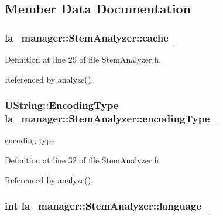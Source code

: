 \subsection{Member Data Documentation}
\hypertarget{classla__manager_1_1StemAnalyzer_f874202062430a5bce7b8ca72ee632ea}{
\subsubsection[{cache\_\-}]{ {\bf la\_\-manager::StemAnalyzer::cache\_\-}}}
\label{classla__manager_1_1StemAnalyzer_f874202062430a5bce7b8ca72ee632ea}




Definition at line 29 of file StemAnalyzer.h.

Referenced by analyze().\hypertarget{classla__manager_1_1StemAnalyzer_f9c9b55d970a5fac76d890c59ee909fb}{
\subsubsection[{encodingType\_\-}]{\setlength{\rightskip}{0pt plus 5cm}UString::EncodingType {\bf la\_\-manager::StemAnalyzer::encodingType\_\-}}}
\label{classla__manager_1_1StemAnalyzer_f9c9b55d970a5fac76d890c59ee909fb}


encoding type 



Definition at line 32 of file StemAnalyzer.h.

Referenced by analyze().\hypertarget{classla__manager_1_1StemAnalyzer_b83df9d67ea2e32b8f7c92ee1c9d8292}{
\subsubsection[{language\_\-}]{\setlength{\rightskip}{0pt plus 5cm}int {\bf la\_\-manager::StemAnalyzer::language\_\-}}}
\label{classla__manager_1_1StemAnalyzer_b83df9d67ea2e32b8f7c92ee1c9d8292}



